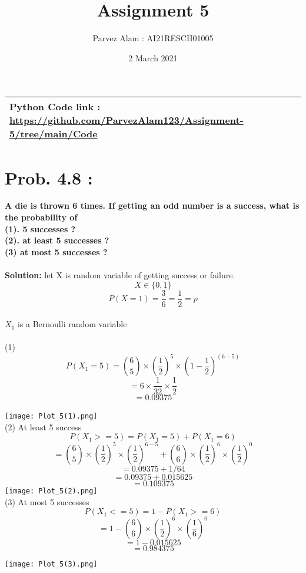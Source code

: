 \documentclass{article}
\title{Assignment 5}
\author{Parvez Alam : AI21RESCH01005 }
\date{ 2 March 2021}
\begin{document}
\maketitle
\begin{multicols}{2}
\begin{center}
    \begin{tabular}{|p{5cm}|}
         \hline
         Python Code link :
         \url{https://github.com/ParvezAlam123/Assignment-5/tree/main/Code} \\
         \hline
          
    \end{tabular}
\end{center}

\section{Prob. 4.8 :}
\textbf{ A die is thrown 6 times. If getting an odd number is a success, what is the probability of \\
(1). 5 successes ?\\
(2). at least 5 successes ?\\
(3) at most 5 successes ?
}\\ \\
\textbf{Solution:} let X is random variable of getting success or failure.
\[X \in \{0,1\}\] 
\[P(X=1)=\frac{3}{6}=\frac{1}{2}=p\] \\
\(X_1\) is  a Bernoulli random variable \\ \\
(1)\[ P(X_1=5)=\binom{6}{5}\times \left(\frac{1}{2}\right)^5 \times \left(1-\frac{1}{2}\right)^{(6-5)}\] 
\[=6 \times \frac{1}{32} \times \frac{1}{2}\]
\[=0.09375\] \\
\texttt{[image: Plot\_5(1).png]}
 \\
 (2) At least 5 success 
\[P(X_1>=5)=P(X_1=5)+P(X_1=6)\]
\[=\binom{6}{5}\times \left(\frac{1}{2}\right)^5 \times   \left(\frac{1}{2}\right)^{6-5}+\binom{6}{6} \times \left(\frac{1}{2}\right)^6 \times \left(\frac{1}{2}\right)^0\]
\[=0.09375+1/64\]
\[=0.09375+0.015625\]
\[=0.109375\]
\texttt{[image: Plot\_5(2).png]} \\
(3) At most  5 successes 
\[P(X_1<=5)=1-P(X_1>=6)\]
\[=1-\binom{6}{6} \times \left(\frac{1}{2}\right)^6 \times \left(\frac{1}{6}\right)^0\]
\[=1-0.015625\]
\[=0.984375\]

\texttt{[image: Plot\_5(3).png]}





\end{multicols}
\end{document}
